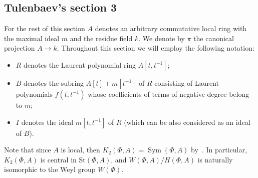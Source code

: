 \documentclass[oneside,12pt]{amsart}
\numberwithin{equation}{section}
\numberwithin{lem}{section}
\theoremstyle{definition}
\theoremstyle{remark}
\newcommand{\Stb}{\mathrm{St}}
\DeclareMathOperator{\Stsym}{Sym}
\begin{document}

\subsection{Tulenbaev's section 3}


For the rest of this section $A$ denotes an arbitrary commutative local ring with the maximal ideal $m$
and the residue field $k$.
We denote by $\pi$ the canonical projection $A \rightarrow k$.
Throughout this section we will employ the following notation:
\begin{itemize}
 \item $R$ denotes the Laurent polynomial ring $A[t, t^{-1}]$;
 \item $B$ denotes the subring $A[t] + m[t^{-1}]$ of $R$ consisting of Laurent polynomials $f(t,t^{-1})$ whose coefficients of terms of negative degree belong to $m$;
 \item $I$ denotes the ideal $m[t, t^{-1}]$ of $R$ (which can be also considered as an ideal of $B$).
\end{itemize}

Note that since $A$ is local, then $K_2(\Phi,A)=\Stsym(\Phi,A)$
by~\cite[Theorem 2.13]{Ste73}. In particular, $K_2(\Phi,A)$ is central in $\Stb(\Phi,A)$,
and $W(\Phi,A)/H(\Phi,A)$ is naturally isomorphic
to the Weyl group $W(\Phi)$.
\end{document}

